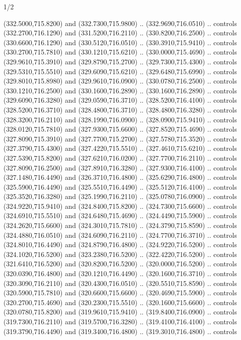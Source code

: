 \begin{flagdescription}{1/2}
\begin{scope}[xshift=0.5\flaglength]
\begin{scope}[scale=0.00745\flagwidth,xshift=-12.1mm,yshift=41.7mm]
\begin{scope}[y=0.80pt, x=0.80pt, yscale=-1, xscale=1, inner sep=0pt, outer sep=0pt]
\begin{scope}[cm={{1.33333,0.0,0.0,-1.33333,(0.0,114.66667)}}]
\begin{scope}[scale=0.100]
  (332.5000,715.8200) and (332.7300,715.9800) .. (332.9690,716.0510) .. controls
  (332.2700,716.1290) and (331.5200,716.2110) .. (330.8200,716.2500) .. controls
  (330.6600,716.1290) and (330.5120,716.0510) .. (330.3910,715.9410) .. controls
  (330.2700,715.7810) and (330.1210,715.6210) .. (330.0000,715.4690) .. controls
  (329.9610,715.3910) and (329.8790,715.2700) .. (329.7300,715.4300) .. controls
  (329.5310,715.5510) and (329.6090,715.6210) .. (329.6480,715.6990) .. controls
  (329.8010,715.8980) and (329.9610,716.0900) .. (330.0780,716.2500) .. controls
  (330.1210,716.2500) and (330.1600,716.2890) .. (330.1600,716.2890) .. controls
  (329.6090,716.3280) and (329.0590,716.3710) .. (328.5200,716.4100) .. controls
  (328.5200,716.3710) and (328.4800,716.3710) .. (328.4800,716.3280) .. controls
  (328.3200,716.2110) and (328.1990,716.0900) .. (328.0900,715.9410) .. controls
  (328.0120,715.7810) and (327.9300,715.6600) .. (327.8520,715.4690) .. controls
  (327.8090,715.3910) and (327.7700,715.2700) .. (327.5780,715.3520) .. controls
  (327.3790,715.4300) and (327.4220,715.5510) .. (327.4610,715.6210) .. controls
  (327.5390,715.8200) and (327.6210,716.0200) .. (327.7700,716.2110) .. controls
  (327.8090,716.2500) and (327.8910,716.3280) .. (327.9300,716.4100) .. controls
  (327.1480,716.4490) and (326.3710,716.4800) .. (325.6290,716.4800) .. controls
  (325.5900,716.4490) and (325.5510,716.4490) .. (325.5120,716.4100) .. controls
  (325.3520,716.3280) and (325.1990,716.2110) .. (325.0780,716.0900) .. controls
  (324.9220,715.9410) and (324.8400,715.8200) .. (324.7300,715.6600) .. controls
  (324.6910,715.5510) and (324.6480,715.4690) .. (324.4490,715.5900) .. controls
  (324.2620,715.6600) and (324.3010,715.7810) .. (324.3790,715.8590) .. controls
  (324.4880,716.0510) and (324.6090,716.2110) .. (324.7700,716.3710) .. controls
  (324.8010,716.4490) and (324.8790,716.4800) .. (324.9220,716.5200) .. controls
  (324.1020,716.5200) and (323.2380,716.5200) .. (322.4220,716.5200) .. controls
  (321.6410,716.5200) and (320.8200,716.5200) .. (320.0000,716.5200) .. controls
  (320.0390,716.4800) and (320.1210,716.4490) .. (320.1600,716.3710) .. controls
  (320.3090,716.2110) and (320.4300,716.0510) .. (320.5510,715.8590) .. controls
  (320.5900,715.7810) and (320.6600,715.6600) .. (320.4690,715.5900) .. controls
  (320.2700,715.4690) and (320.2300,715.5510) .. (320.1600,715.6600) .. controls
  (320.0780,715.8200) and (319.9610,715.9410) .. (319.8400,716.0900) .. controls
  (319.7300,716.2110) and (319.5700,716.3280) .. (319.4100,716.4100) .. controls
  (319.3790,716.4490) and (319.3400,716.4800) .. (319.3010,716.4800) .. controls

\end{scope}
\end{scope}
\end{scope}
\end{scope}
\end{scope}
\end{flagdescription}
